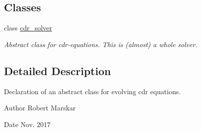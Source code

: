 \subsection*{Classes}
\begin{DoxyCompactItemize}
\item 
class \hyperlink{classcdr__solver}{cdr\+\_\+solver}
\begin{DoxyCompactList}\small\item\em Abstract class for cdr-\/equations. This is (almost) a whole solver. \end{DoxyCompactList}\end{DoxyCompactItemize}


\subsection{Detailed Description}
Declaration of an abstract class for evolving cdr equations. 

\begin{DoxyAuthor}{Author}
Robert Marskar 
\end{DoxyAuthor}
\begin{DoxyDate}{Date}
Nov. 2017 
\end{DoxyDate}
